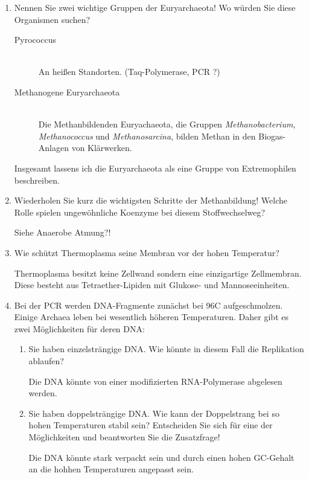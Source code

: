 \begin{enumerate}
	\item Nennen Sie zwei wichtige Gruppen der Euryarchaeota! Wo würden Sie diese Organismen suchen?
		
		\begin{description}
			\item[Pyrococcus] \hfill \\
				An heißen Standorten.
				(Taq-Polymerase, PCR ?)
			\item[Methanogene Euryarchaeota] \hfill \\
				Die Methanbildenden Euryachaeota, 
				die Gruppen \emph{Methanobacterium}, \emph{Methanococcus} und \emph{Methanosarcina},
				bilden Methan in den Biogas-Anlagen von Klärwerken.
		\end{description}
		Insgesamt lassens ich die Euryarchaeota als eine Gruppe von Extremophilen beschreiben.

	\item Wiederholen Sie kurz die wichtigsten Schritte der Methanbildung! Welche Rolle spielen ungewöhnliche Koenzyme bei diesem Stoffwechselweg?

		Siehe Anaerobe Atmung?!
	
	\item Wie schützt Thermoplasma seine Membran vor der hohen Temperatur?

		Thermoplasma besitzt keine Zellwand sondern eine einzigartige Zellmembran.
		Diese besteht aus Tetraether-Lipiden mit Glukose- und Mannoseeinheiten.

	\item Bei der PCR werden DNA-Fragmente zunächst bei 96\textdegree C aufgeschmolzen. Einige Archaea leben bei wesentlich höheren Temperaturen. Daher gibt es zwei Möglichkeiten für deren DNA:
	\begin{enumerate}
		\item Sie haben einzelsträngige DNA. Wie könnte in diesem Fall die Replikation ablaufen?
				
			Die DNA könnte von einer modifizierten RNA-Polymerase abgelesen werden.

		\item Sie haben doppelsträngige DNA. Wie kann der Doppelstrang bei so hohen Temperaturen stabil sein? Entscheiden Sie sich für eine der Möglichkeiten und beantworten Sie die Zusatzfrage!
			
			Die DNA könnte stark verpackt sein und durch einen hohen GC-Gehalt an die hohhen Temperaturen angepasst sein.

	\end{enumerate}
\end{enumerate}
	
